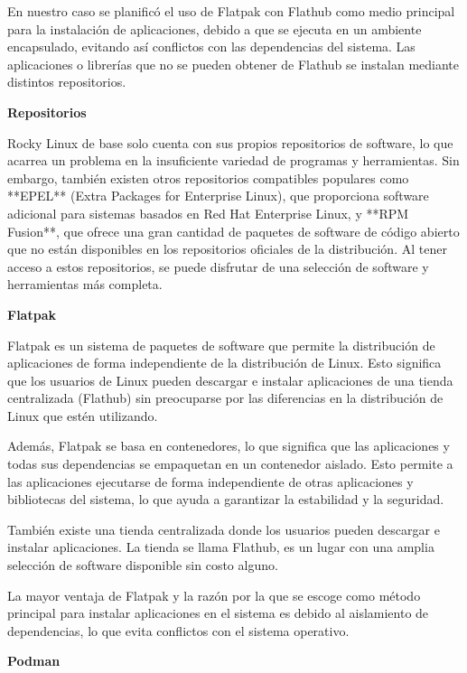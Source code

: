 \begin{spacing}{1.5}
    En nuestro caso se planificó el uso de Flatpak con Flathub como medio principal para la instalación de aplicaciones, debido a que se ejecuta en un ambiente encapsulado, evitando así conflictos con las dependencias del sistema. Las aplicaciones o librerías que no se pueden obtener de Flathub se instalan mediante distintos repositorios.

    \textbf{Repositorios}
    
    Rocky Linux de base solo cuenta con sus propios repositorios de software, lo que acarrea un problema en la insuficiente variedad de programas y herramientas. Sin embargo, también existen otros repositorios compatibles populares como **EPEL** (Extra Packages for Enterprise Linux), que proporciona software adicional para sistemas basados en Red Hat Enterprise Linux, y **RPM Fusion**, que ofrece una gran cantidad de paquetes de software de código abierto que no están disponibles en los repositorios oficiales de la distribución. Al tener acceso a estos repositorios, se puede disfrutar de una selección de software y herramientas más completa. \cite{RL-repo-1} \cite{RHEL-EPEL-1} \cite{rpmfusion-1}

    \textbf{Flatpak}
    
    Flatpak es un sistema de paquetes de software que permite la distribución de aplicaciones de forma independiente de la distribución de Linux. Esto significa que los usuarios de Linux pueden descargar e instalar aplicaciones de una tienda centralizada (Flathub) sin preocuparse por las diferencias en la distribución de Linux que estén utilizando.

    Además, Flatpak se basa en contenedores, lo que significa que las aplicaciones y todas sus dependencias se empaquetan en un contenedor aislado. Esto permite a las aplicaciones ejecutarse de forma independiente de otras aplicaciones y bibliotecas del sistema, lo que ayuda a garantizar la estabilidad y la seguridad.

    También existe una tienda centralizada donde los usuarios pueden descargar e instalar aplicaciones. La tienda se llama Flathub, es un lugar con una amplia selección de software disponible sin costo alguno.

    La mayor ventaja de Flatpak y la razón por la que se escoge como método principal para instalar aplicaciones en el sistema es debido al aislamiento de dependencias, lo que evita conflictos con el sistema operativo. \cite{FLAT-1} \cite{FLAT-2} \cite{RHEL-FLAT-1} \cite{PHOENIX-FLAT-1}

    \textbf{Podman}
    

\end{spacing}
